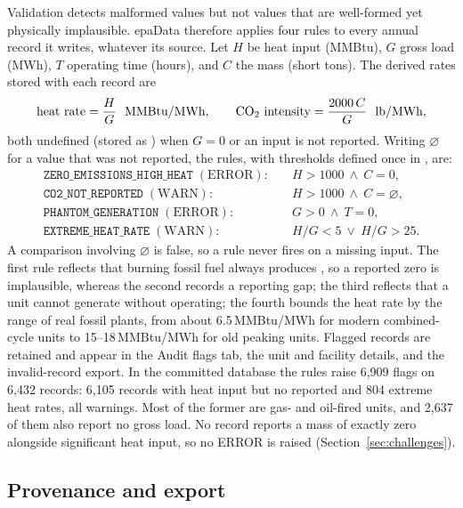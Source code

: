 \documentclass[11pt,a4paper]{article}
\begin{document}
Validation detects malformed values but not values that are well-formed yet physically
implausible. epaData therefore applies four rules to every annual record it writes, whatever
its source. Let $H$ be heat input (MMBtu), $G$ gross load (MWh), $T$ operating time (hours),
and $C$ the \COtwo{} mass (short tons). The derived rates stored with each record are
\begin{equation}
  \text{heat rate} = \frac{H}{G}\ \ \text{MMBtu/MWh}, \qquad
  \text{\COtwo{} intensity} = \frac{2000\,C}{G}\ \ \text{lb/MWh},
\end{equation}
both undefined (stored as ) when $G = 0$ or an input is not reported. Writing
$\varnothing$ for a value that was not reported, the rules, with thresholds defined once in
, are:
\begin{align}
  \texttt{ZERO\_EMISSIONS\_HIGH\_HEAT} \;(\text{ERROR}):&\quad H > 1000 \ \wedge\ C = 0,\\
  \texttt{CO2\_NOT\_REPORTED} \;(\text{WARN}):&\quad H > 1000 \ \wedge\ C = \varnothing,\\
  \texttt{PHANTOM\_GENERATION} \;(\text{ERROR}):&\quad G > 0 \ \wedge\ T = 0,\\
  \texttt{EXTREME\_HEAT\_RATE} \;(\text{WARN}):&\quad H/G < 5 \ \vee\ H/G > 25.
\end{align}
A comparison involving $\varnothing$ is false, so a rule never fires on a missing input. The
first rule reflects that burning fossil fuel always produces \COtwo, so a reported zero is
implausible, whereas the second records a reporting gap; the third reflects that a unit cannot
generate without operating; the fourth bounds the heat rate by the range of real
fossil plants, from about 6.5\,MMBtu/MWh for modern combined-cycle units to 15--18\,MMBtu/MWh
for old peaking units. Flagged records are retained and appear in the Audit flags tab, the unit
and facility details, and the invalid-record export. In the committed database the rules raise
6{,}909 flags on 6{,}432 records: 6{,}105 records with heat input but no reported \COtwo{} and
804 extreme heat rates, all warnings. Most of the former are gas- and oil-fired units, and
2{,}637 of them also report no gross load. No record reports a \COtwo{} mass of exactly zero
alongside significant heat input, so no ERROR is raised (Section~\ref{sec:challenges}).

\subsection{Provenance and export}
\label{sec:feat-provenance}
\end{document}
